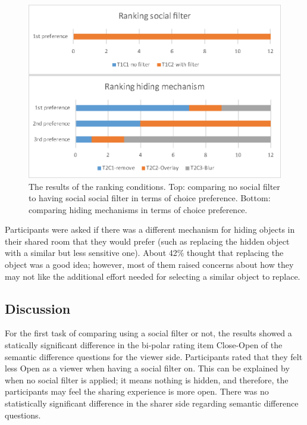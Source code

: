\begin{figure}
    \begin{center}
    \includegraphics[width=.8\linewidth]{images/54-hiding-frontier18/images-19.eps}
    \caption{The results of the ranking conditions. Top: comparing no social filter to having social social filter in terms of choice preference. Bottom: comparing hiding mechanisms in terms of choice preference.}
    \label{fig:frontier18:result-ranking}
    \end{center}
\end{figure}

Participants were asked if there was a different mechanism for hiding objects in their shared room that they would prefer (such as replacing the hidden object with a similar but less sensitive one). About 42\% thought that replacing the object was a good idea; however, most of them raised concerns about how they may not like the additional effort needed for selecting a similar object to replace.

\subsection{Discussion}

For the first task of comparing using a social filter or not, the results showed a statically significant difference in the bi-polar rating item Close-Open of the semantic difference questions for the viewer side. Participants rated that they felt less Open as a viewer when having a social filter on. This can be explained by when no social filter is applied; it means nothing is hidden, and therefore, the participants may feel the sharing experience is more open. There was no statistically significant difference in the sharer side regarding semantic difference questions. 

